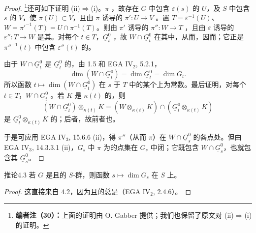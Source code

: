 \begin{proof}
\footnote{\textbf{编者注（30）：}上面的证明由 O. Gabber 提供；我们也保留了原文对 (ii)$\Rightarrow$(i) 的证明。}还可如下证明 (ii)$\Rightarrow$(i)。$\pi$ ，故存在 $G$ 中包含 $\varepsilon(s)$ 的 $U$，及 $S$ 中包含 $s$ 的 $V$，使 $\pi(U)\subset V$，且由 $\pi$ 诱导的 $\pi':U\to V$ 。置 $T=\varepsilon^{-1}(U)$、$W=\pi'^{-1}(T)=U\cap\pi^{-1}(T)$。则由 $\pi'$ 诱导的 $\pi'':W\to T$ ，且由 $\varepsilon$ 诱导的 $\varepsilon'':T\to W$ 是其。对每个 $t\in T$，$\underline G_t^0$
，故 $W\cap\underline G_t^0$ 在其中，从而，因而；它正是 $\pi''^{-1}(t)$ 中包含 $\varepsilon''(t)$ 的。

由于 $W\cap\underline G_t^0$ 是 $\underline G_t^0$ 的，由 1.5 和 EGA IV$_2$, 5.2.1，
\[
\dim(W\cap\underline G_t^0)=\dim\underline G_t^0=\dim G_t.
\]
所以函数 $t\mapsto\dim(W\cap\underline G_t^0)$ 在 $s$ 于 $T$ 中的某个上为常数。最后证明，对每个 $t\in T$，$W\cap\underline G_t^0$ 。若 $K$ 是 $\kappa(t)$ 的，则
\[
(W\cap\underline G_t^0)\otimes_{\kappa(t)}K
=(W\otimes_{\kappa(t)}K)\cap(\underline G_t^0\otimes_{\kappa(t)}K)
\]
是 $\underline G_t^0\otimes_{\kappa(t)}K$ 的；后者，故前者也。

于是可应用 EGA IV$_3$, 15.6.6 (ii)，得 $\pi''$（从而 $\pi$）在 $W\cap\underline G_s^0$ 的各点处。但由 EGA IV$_3$, 14.3.3.1 (ii)，$G_s$ 中 $\pi$ 为的点集在 $G_s$ 中闭；它既包含 $W\cap\underline G_s^0$，也就包含其 $\underline G_s^0$。
\end{proof}
\begin{SGAresult}{推论}{4.3}
若 $G$ 是且的 $S$-群，则函数 $s\mapsto\dim G_s$ 在 $S$ 上。
\end{SGAresult}
\begin{proof}
这直接来自 4.2，因为且的总是（EGA IV$_2$, 2.4.6）。
\end{proof}
